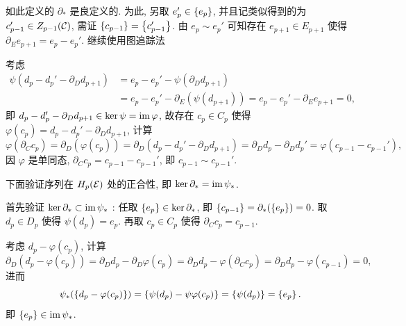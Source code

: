 \begin{Proof}
	如此定义的 $ \partial_* $ 是良定义的. 为此, 另取 $ e_p'\in\left\{ e_p \right\} $, 并且记类似得到的为 $ c_{p-1}'\in Z_{p-1}(\mathcal{C}) $, 需证 $ \left\{ c_{p-1} \right\}=\left\{ c_{p-1}' \right\} $. 由 $ e_p\sim e_p' $ 可知存在 $ e_{p+1}\in E_{p+1} $ 使得 $ \partial_E e_{p+1}=e_p-e_p' $. 继续使用图追踪法
	\begin{center}
	\end{center}
	考虑
	\[
		\begin{aligned}
			\psi(d_p-d_p'-\partial_D d_{p+1})&=e_p-e_p'-\psi(\partial_D d_{p+1})\\
			&=e_p-e_p'-\partial_E(\psi(d_{p+1}))=e_p-e_p'-\partial_E e_{p+1}=0,
		\end{aligned}
	\]
	即 $ d_p-d_p'-\partial_D d_{p+1}\in\ker\psi=\mathrm{im}\,\varphi $, 故存在 $ c_p\in C_p $ 使得 $ \varphi(c_p)=d_p-d_p'-\partial_D d_{p+1} $, 计算
	\[
		\varphi(\partial_C c_p)=\partial_D(\varphi(c_p))=\partial_D(d_p-d_p'-\partial_D d_{p+1})=\partial_D d_p-\partial_D d_p'=\varphi(c_{p-1}-c_{p-1}'),
	\]
	因 $ \varphi $ 是单同态, $ \partial_C c_p=c_{p-1}-c_{p-1}' $, 即 $ c_{p-1}\sim c_{p-1}' $.

	下面验证序列在 $ H_p(\mathcal{E}) $ 处的正合性, 即 $ \ker\partial_*=\mathrm{im}\,\psi_* $. 

	首先验证 $ \ker\partial_*\subset\mathrm{im}\,\psi_* $ : 任取 $ \left\{ e_p \right\}\in\ker\partial_* $, 即 $ \left\{ c_{p-1} \right\}=\partial_*(\left\{ e_p \right\})=0 $. 取 $ d_p\in D_p $ 使得 $ \psi(d_p)=e_p $. 再取 $ c_p\in C_p $ 使得 $ \partial_C c_p=c_{p-1} $.
	\begin{center}
	\end{center}
	考虑 $ d_p-\varphi(c_p) $, 计算
	\[
		\partial_D(d_p-\varphi(c_p))=\partial_D d_p-\partial_D\varphi(c_p)=\partial_D d_p-\varphi(\partial_C c_p)=\partial_D d_p-\varphi(c_{p-1})=0,
	\]
	进而
	\[
		\psi_*(\left\{ d_p-\varphi(c_p) \right\})=\left\{ \psi(d_p)-\psi\varphi(c_p) \right\}=\left\{ \psi(d_p) \right\}=\left\{ e_p \right\}.
	\]
	即 $ \left\{ e_p \right\}\in\mathrm{im}\,\psi_* $.


\end{Proof}
